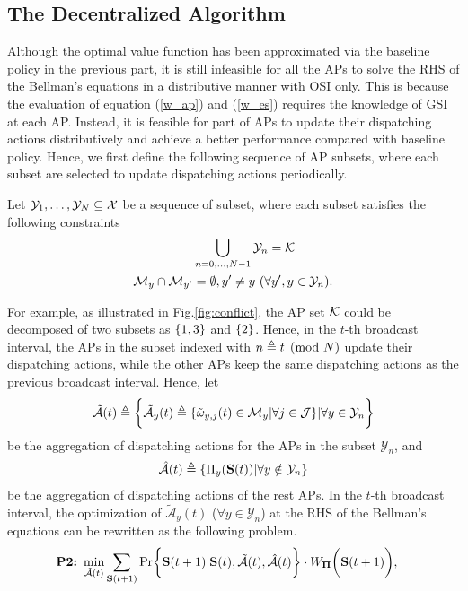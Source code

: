 \subsection{The Decentralized Algorithm}
\label{subsec:ap_alg}
Although the optimal value function has been approximated via the baseline policy in the previous part, it is still infeasible for all the APs to solve the RHS of the Bellman's equations in a distributive manner with OSI only.
This is because the evaluation of equation (\ref{w_ap}) and (\ref{w_es}) requires the knowledge of GSI at each AP.
Instead, it is feasible for part of APs to update their dispatching actions distributively and achieve a better performance compared with baseline policy.
Hence, we first define the following sequence of AP subsets, where each subset are selected to update dispatching actions periodically.
\begin{definition}
    Let $\mathcal{Y}_{1}, \dots, \mathcal{Y}_{N} \subseteq \mathcal{X}$ be a sequence of subset, where each subset satisfies the following constraints
    \begin{align}
        &\bigcup_{n=0,\dots,N-1} \mathcal{Y}_{n} = \mathcal{K}
        \\
        \mathcal{M}_{y} \cap \mathcal{M}_{y'} &=\emptyset, y' \neq y~(\forall y',y \in \mathcal{Y}_{n}).
    \end{align}
\end{definition}
For example, as illustrated in Fig.\ref{fig:conflict}, the AP set $\mathcal{K}$ could be decomposed of two subsets as $\{1,3\}$ and $\{2\}$.
Hence, in the $t$-th broadcast interval, the APs in the subset indexed with $n \triangleq t \pmod{N}$ update their dispatching actions, while the other APs keep the same dispatching actions as the previous broadcast interval.
Hence, let
\begin{align}
    \tilde{\mathcal{A}}(t) \triangleq \bigg\{
        \tilde{\mathcal{A}}_{y}(t) \triangleq \{ \tilde{\omega}_{y,j}(t)\in \mathcal{M}_{y}|\forall j\in\mathcal{J} \} | \forall y\in\mathcal{Y}_{n}
    \bigg\}
\end{align}
be the aggregation of dispatching actions for the APs in the subset $\mathcal{Y}_{n}$, and
\begin{align}
    \hat{\mathcal{A}}(t) \triangleq \{\Pi_{y}(\mathbf{S}(t)) | \forall y\notin\mathcal{Y}_{n}\}
\end{align}
be the aggregation of dispatching actions of the rest APs.
In the $t$-th broadcast interval, the optimization of $\tilde{\mathcal{A}}_{y}(t)$ ($\forall y\in\mathcal{Y}_{n}$) at the RHS of the Bellman's equations can be rewritten as the following problem.
{\small
\begin{align}
    \textbf{P2:}~
    \min_{ \tilde{\mathcal{A}}(t) }
    &\sum_{\Stat(t+1)} \Pr\Brace{
        \Stat(t+1) | \Stat(t), \tilde{\mathcal{A}}(t), \hat{\mathcal{A}}(t)
    } \cdot W_{\Baseline}\Paren{\Stat(t+1)},
\end{align}
}

